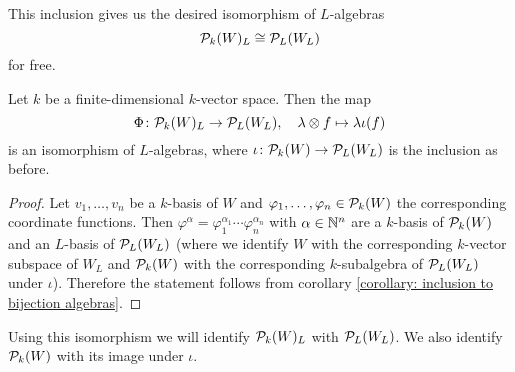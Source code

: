This inclusion gives us the desired isomorphism of $L$-algebras
\[
        \mathcal{P}_k(W)_L
  \cong \mathcal{P}_L(W_L)
\]
for free.


\begin{proposition}
  Let $k$ be a finite-dimensional $k$-vector space.
  Then the map
  \[
            \Phi
    \colon  \mathcal{P}_k(W)_L
    \to     \mathcal{P}_L(W_L),
    \quad   \lambda \otimes f
    \mapsto \lambda \iota(f)
  \]
  is an isomorphism of $L$-algebras, where $\iota \colon \mathcal{P}_k(W) \to \mathcal{P}_L(W_L)$ is the inclusion as before.
\end{proposition}
\begin{proof}
  Let $v_1, \dotsc, v_n$ be a $k$-basis of $W$ and $\varphi_1, \dotsc, \varphi_n \in \mathcal{P}_k(W)$ the corresponding coordinate functions.
  Then $\varphi^\alpha = \varphi_1^{\alpha_1} \dotsm \varphi_n^{\alpha_n}$ with $\alpha \in \mathbb{N}^n$ are a $k$-basis of $\mathcal{P}_k(W)$ and an $L$-basis of $\mathcal{P}_L(W_L)$ (where we identify $W$ with the corresponding $k$-vector subspace of $W_L$ and $\mathcal{P}_k(W)$ with the corresponding $k$-subalgebra of $\mathcal{P}_L(W_L)$ under $\iota$).
  Therefore the statement follows from corollary \ref{corollary: inclusion to bijection algebras}.
\end{proof}


Using this isomorphism we will identify $\mathcal{P}_k(W)_L$ with $\mathcal{P}_L(W_L)$.
We also identify $\mathcal{P}_k(W)$ with its image under $\iota$.


